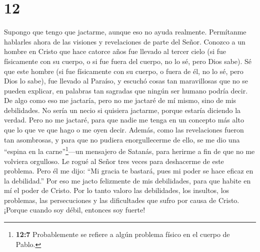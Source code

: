 \hypertarget{section-11}{%
\section{12}\label{section-11}}

 Supongo que tengo que jactarme, aunque eso no ayuda
realmente. Permítanme hablarles ahora de las visiones y revelaciones de
parte del Señor.  Conozco a un hombre en Cristo que hace
catorce años fue llevado al tercer cielo (si fue físicamente con su
cuerpo, o si fue fuera del cuerpo, no lo sé, pero Dios sabe).
 Sé que este hombre (si fue físicamente con su cuerpo, o
fuera de él, no lo sé, pero Dios lo sabe),  fue llevado al
Paraíso, y escuchó cosas tan maravillosas que no se pueden explicar, en
palabras tan sagradas que ningún ser humano podría decir. 
De algo como eso me jactaría, pero no me jactaré de mí mismo, sino de
mis debilidades.  No sería un necio si quisiera jactarme,
porque estaría diciendo la verdad. Pero no me jactaré, para que nadie me
tenga en un concepto más alto que lo que ve que hago o me oyen decir.
 Además, como las revelaciones fueron tan asombrosas, y para
que no pudiera enorgullecerme de ello, se me dio una ``espina en la
carne''\footnote{\textbf{12:7} Probablemente se refiere a algún problema
  físico en el cuerpo de Pablo.}---un mensajero de Satanás, para herirme
a fin de que no me volviera orgulloso.  Le rogué al Señor
tres veces para deshacerme de este problema.  Pero él me
dijo: ``Mi gracia te bastará, pues mi poder se hace eficaz en la
debilidad.'' Por eso me jacto felizmente de mis debilidades, para que
habite en mí el poder de Cristo.  Por lo tanto valoro las
debilidades, los insultos, los problemas, las persecuciones y las
dificultades que sufro por causa de Cristo. ¡Porque cuando soy débil,
entonces soy fuerte!

